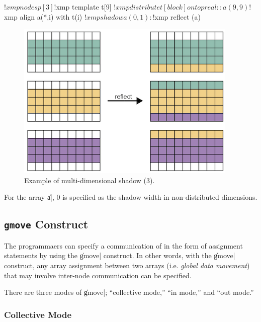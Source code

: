 \begin{XFexample}
!$xmp nodes p[3]
!$xmp template t[9]
!$xmp distribute t[block] onto p
real :: a(9,9)
!$xmp align a(*,i) with t(i)
!$xmp shadow a(0,1)
  :
!$xmp reflect (a)
\end{XFexample}

\begin{figure}
  \centering
  \includegraphics{figs/1of2.png}
  \caption{Example of multi-dimensional shadow (3).}
\end{figure}

For the array \|a|, 0 is specified as the shadow width in
non-distributed dimensions.


\subsection{{\tt gmove} Construct}

The programmaers can specify a communication of {\darrays} in
the form of assignment statements by using the \|gmove| construct.
%
In other words, with the \|gmove| construct, any array assignment
between two arrays (i.e. {\it global data movement}) that may involve
inter-node communication can be specified.

There are three modes of \|gmove|; ``collective mode,'' ``in mode,'' and
``out mode.''

\subsubsection{Collective Mode}

